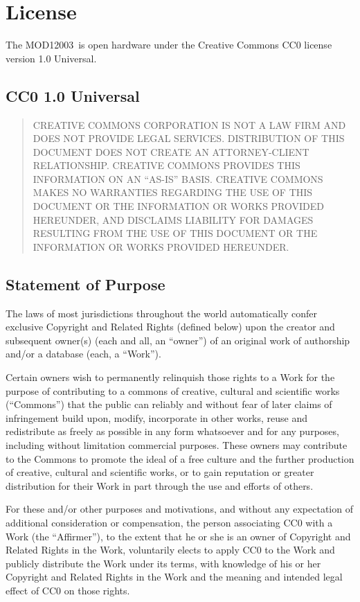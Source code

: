 \documentclass[letterpaper,twocolumn,10pt,openany,oneside,final,fleqn]{memoir}
\newcommand{\Model}{MOD12003\ }
\begin{document}
\newpage
\onecolumn
\chapter{License}

The \Model is open hardware under the Creative Commons CC0 license
version 1.0 Universal.

\section{CC0 1.0 Universal}

\begin{quote}
    CREATIVE COMMONS CORPORATION IS NOT A LAW FIRM AND DOES NOT PROVIDE
    LEGAL SERVICES. DISTRIBUTION OF THIS DOCUMENT DOES NOT CREATE AN
    ATTORNEY-CLIENT RELATIONSHIP. CREATIVE COMMONS PROVIDES THIS
    INFORMATION ON AN ``AS-IS'' BASIS. CREATIVE COMMONS MAKES NO WARRANTIES
    REGARDING THE USE OF THIS DOCUMENT OR THE INFORMATION OR WORKS
    PROVIDED HEREUNDER, AND DISCLAIMS LIABILITY FOR DAMAGES RESULTING FROM
    THE USE OF THIS DOCUMENT OR THE INFORMATION OR WORKS PROVIDED
    HEREUNDER.
\end{quote}

\section*{Statement of Purpose}

The laws of most jurisdictions throughout the world automatically confer
exclusive Copyright and Related Rights (defined below) upon the creator
and subsequent owner(s) (each and all, an ``owner'') of an original work of
authorship and/or a database (each, a ``Work'').

Certain owners wish to permanently relinquish those rights to a Work for
the purpose of contributing to a commons of creative, cultural and
scientific works (``Commons'') that the public can reliably and without fear
of later claims of infringement build upon, modify, incorporate in other
works, reuse and redistribute as freely as possible in any form whatsoever
and for any purposes, including without limitation commercial purposes.
These owners may contribute to the Commons to promote the ideal of a free
culture and the further production of creative, cultural and scientific
works, or to gain reputation or greater distribution for their Work in
part through the use and efforts of others.

For these and/or other purposes and motivations, and without any
expectation of additional consideration or compensation, the person
associating CC0 with a Work (the ``Affirmer''), to the extent that he or she
is an owner of Copyright and Related Rights in the Work, voluntarily
elects to apply CC0 to the Work and publicly distribute the Work under its
terms, with knowledge of his or her Copyright and Related Rights in the
Work and the meaning and intended legal effect of CC0 on those rights.
\end{document}
